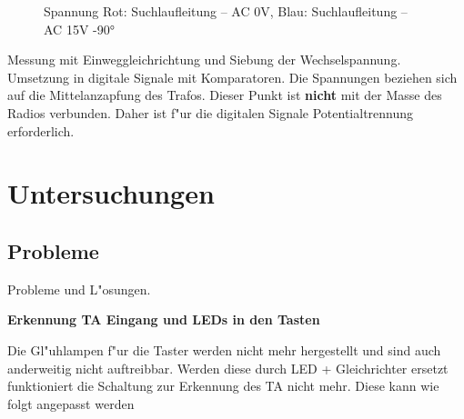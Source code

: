 \documentclass[ngerman,11pt,parskip=half] {scrartcl}
\begin{document}
\begin{figure}[H]
\centering
{}
\caption{Spannung Rot: Suchlaufleitung -- AC 0V, Blau: Suchlaufleitung -- AC 15V -90°} \label{fig:1}
\end{figure}

Messung mit Einweggleichrichtung und Siebung der Wechselspannung. Umsetzung in digitale Signale mit Komparatoren. Die Spannungen beziehen sich auf die Mittelanzapfung des Trafos. Dieser Punkt ist \textbf{nicht} mit der Masse des Radios verbunden. Daher ist f"ur die digitalen Signale Potentialtrennung erforderlich.

\section{Untersuchungen} \label{sec:untersuchung}

\subsection{Probleme} \label{sec:untersuchung:probleme}

Probleme und L"osungen.

\textbf{Erkennung TA Eingang und LEDs in den Tasten}

Die Gl"uhlampen f"ur die Taster werden nicht mehr hergestellt und sind auch anderweitig nicht auftreibbar. Werden diese durch LED + Gleichrichter ersetzt funktioniert die Schaltung zur Erkennung des TA nicht mehr. Diese kann wie folgt angepasst werden
\end{document}
